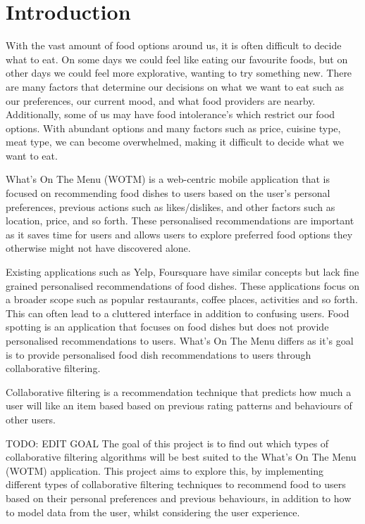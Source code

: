 \chapter{Introduction}\label{C:intro}

With the vast amount of food options around us, it is often difficult to decide what to eat. On some days we could feel like eating our favourite foods, but on other days we could feel more explorative, wanting to try something new. There are many factors that determine our decisions on what we want to eat such as our preferences, our current mood, and what food providers are nearby. Additionally, some of us may have food intolerance's which restrict our food options. With abundant options and many factors such as price, cuisine type, meat type, we can become overwhelmed, making it difficult to decide what we want to eat. 

What’s On The Menu (WOTM) is a web-centric mobile application that is focused on recommending food dishes to users based on the user’s personal preferences, previous actions such as likes/dislikes, and other factors such as location, price, and so forth. These personalised recommendations are important as it saves time for users and allows users to explore preferred food options they otherwise might not have discovered alone. 

Existing applications such as Yelp, Foursquare have similar concepts but lack fine grained personalised recommendations of food dishes. These applications focus on a broader scope such as popular restaurants, coffee places, activities and so forth. This can often lead to a cluttered interface in addition to confusing users. Food spotting is an application that focuses on food dishes but does not provide personalised recommendations to users. What's On The Menu differs as it's goal is to provide personalised food dish recommendations to users through collaborative filtering. 

Collaborative filtering is a recommendation technique that predicts how much a user will like an item based based on previous rating patterns and behaviours of other users. 

TODO: EDIT GOAL
The goal of this project is to find out which types of collaborative filtering algorithms will be best suited to the What's On The Menu (WOTM) application. This project aims to explore this, by implementing different types of collaborative filtering techniques to recommend food to users based on their personal preferences and previous behaviours, in addition to how to model data from the user, whilst considering the user experience. 

